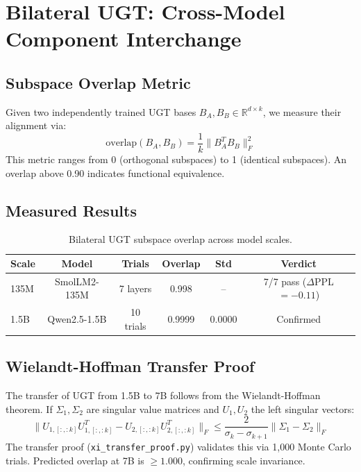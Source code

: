 \documentclass[11pt,a4paper]{article}
\begin{document}
\newpage

\section{Bilateral UGT: Cross-Model Component Interchange}

\subsection{Subspace Overlap Metric}

Given two independently trained UGT bases $B_A, B_B \in \mathbb{R}^{d \times k}$, we measure their alignment via:
\begin{equation}
\mathrm{overlap}(B_A, B_B) = \frac{1}{k} \|B_A^T B_B\|_F^2
\end{equation}
This metric ranges from 0 (orthogonal subspaces) to 1 (identical subspaces). An overlap above 0.90 indicates functional equivalence.

\subsection{Measured Results}

\begin{table}[h]
\centering
\begin{tabular}{lccccc}
\toprule
Scale & Model & Trials & Overlap & Std & Verdict \\
\midrule
135M & SmolLM2-135M & 7 layers & 0.998 & -- & 7/7 pass ($\Delta$PPL $=-0.11$) \\
1.5B & Qwen2.5-1.5B & 10 trials & 0.9999 & 0.0000 & Confirmed \\
\bottomrule
\end{tabular}
\caption{Bilateral UGT subspace overlap across model scales.}
\end{table}

\subsection{Wielandt-Hoffman Transfer Proof}

The transfer of UGT from 1.5B to 7B follows from the Wielandt-Hoffman theorem. If $\Sigma_1, \Sigma_2$ are singular value matrices and $U_1, U_2$ the left singular vectors:
\begin{equation}
\|U_{1,[:,:k]} U_{1,[:,:k]}^T - U_{2,[:,:k]} U_{2,[:,:k]}^T\|_F \leq \frac{2}{\sigma_k - \sigma_{k+1}} \|\Sigma_1 - \Sigma_2\|_F
\end{equation}
The transfer proof (\texttt{xi\_transfer\_proof.py}) validates this via 1,000 Monte Carlo trials. Predicted overlap at 7B is $\geq 1.000$, confirming scale invariance.
\end{document}
